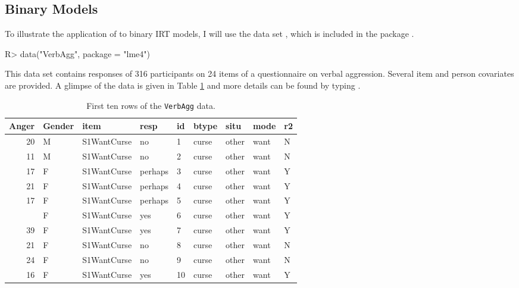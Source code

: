 \documentclass[jss]{jss}
\begin{document}
\hypertarget{binary}{%
\subsection{Binary Models}\label{binary}}

To illustrate the application of  to binary IRT models, I will
use the  data set \citep{deboeck2004}, which is included
in the  package \citep{lme4}.

\begin{CodeChunk}

\begin{CodeInput}
R> data("VerbAgg", package = "lme4")
\end{CodeInput}
\end{CodeChunk}

This data set contains responses of 316 participants on 24 items of a
questionnaire on verbal aggression. Several item and person covariates
are provided. A glimpse of the data is given in Table
\ref{tab:head-VerbAgg} and more details can be found by typing
.

\begin{CodeChunk}
\begin{table}[t]

\caption{\label{tab:head-VerbAgg}First ten rows of the \texttt{VerbAgg} data.}
\centering
\begin{tabular}{rllllllll}
\toprule
Anger & Gender & item & resp & id & btype & situ & mode & r2\\
\midrule
20 & M & S1WantCurse & no & 1 & curse & other & want & N\\
11 & M & S1WantCurse & no & 2 & curse & other & want & N\\
17 & F & S1WantCurse & perhaps & 3 & curse & other & want & Y\\
21 & F & S1WantCurse & perhaps & 4 & curse & other & want & Y\\
17 & F & S1WantCurse & perhaps & 5 & curse & other & want & Y\\
\addlinespace
21 & F & S1WantCurse & yes & 6 & curse & other & want & Y\\
39 & F & S1WantCurse & yes & 7 & curse & other & want & Y\\
21 & F & S1WantCurse & no & 8 & curse & other & want & N\\
24 & F & S1WantCurse & no & 9 & curse & other & want & N\\
16 & F & S1WantCurse & yes & 10 & curse & other & want & Y\\
\bottomrule
\end{tabular}
\end{table}

\end{CodeChunk}
\end{document}
